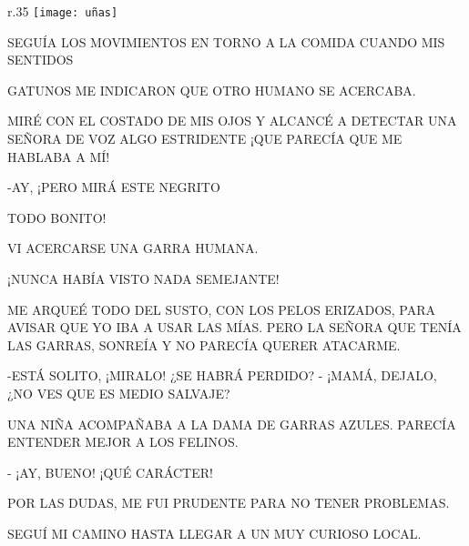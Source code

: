 \newpage

\begin{wrapfigure}{r}{.35\textwidth}
	\texttt{[image: uñas]}
\end{wrapfigure}
SEGUÍA LOS MOVIMIENTOS EN TORNO A LA COMIDA CUANDO MIS SENTIDOS

GATUNOS ME INDICARON QUE OTRO HUMANO SE ACERCABA.

MIRÉ CON EL COSTADO DE MIS OJOS Y ALCANCÉ A DETECTAR UNA SEÑORA DE VOZ 
ALGO ESTRIDENTE ¡QUE PARECÍA QUE ME HABLABA A MÍ!

	-AY, ¡PERO MIRÁ ESTE NEGRITO 
	
	TODO BONITO!
	
	VI ACERCARSE UNA GARRA HUMANA. 
	
	¡NUNCA HABÍA VISTO NADA SEMEJANTE!
	
	


\newpage
{}			
ME ARQUEÉ TODO DEL SUSTO, CON LOS PELOS ERIZADOS, PARA AVISAR QUE YO IBA A USAR LAS MÍAS.		
PERO LA SEÑORA QUE TENÍA LAS GARRAS, SONREÍA Y NO PARECÍA QUERER ATACARME.

-ESTÁ SOLITO, ¡MIRALO! ¿SE HABRÁ PERDIDO?
\newline
\vspace{.35\textheight}
- ¡MAMÁ, DEJALO, ¿NO VES QUE ES MEDIO SALVAJE?

UNA NIÑA ACOMPAÑABA A LA DAMA DE GARRAS AZULES.		
PARECÍA ENTENDER MEJOR A LOS FELINOS.

- ¡AY, BUENO! ¡QUÉ CARÁCTER! 

POR LAS DUDAS, ME FUI PRUDENTE PARA NO TENER PROBLEMAS.
\newpage
{}	
SEGUÍ MI CAMINO HASTA LLEGAR A UN MUY CURIOSO LOCAL. 

